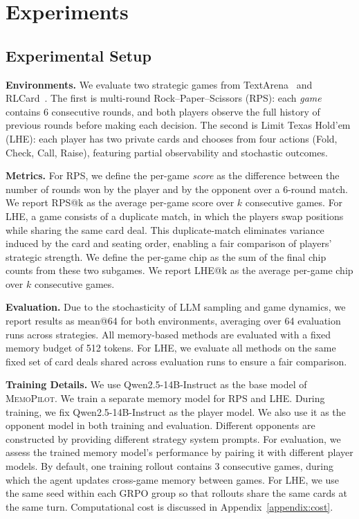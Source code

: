 \documentclass{article}
\newcommand{\methodname}{MemoPilot}
\newcommand{\method}{\textsc{\methodname}}
\theoremstyle{plain}
\theoremstyle{definition}
\theoremstyle{remark}
\begin{document}
\section{Experiments}
\label{sec:experiments}

\subsection{Experimental Setup}

\textbf{Environments.}
We evaluate two strategic games from TextArena~\citep{guertler2025textarena} and RLCard~\citep{zha2019rlcard}. The first is multi-round Rock--Paper--Scissors (RPS): each \emph{game} contains 6 consecutive rounds, and both players observe the full history of previous rounds before making each decision. The second is Limit Texas Hold'em (LHE): each player has two private cards and chooses from four actions (Fold, Check, Call, Raise), featuring partial observability and stochastic outcomes.

\textbf{Metrics.}
For RPS, we define the per-game \emph{score} as the difference between the number of rounds won by the player and by the opponent over a 6-round match. We report RPS@k as the average per-game score over $k$ consecutive games. For LHE, a game consists of a duplicate match, in which the players swap positions while sharing the same card deal. This duplicate-match eliminates variance induced by the card and seating order, enabling a fair comparison of players’ strategic strength. We define the per-game chip as the sum of the final chip counts from these two subgames. We report LHE@k as the average per-game chip over $k$ consecutive games. 

\textbf{Evaluation.}
Due to the stochasticity of LLM sampling and game dynamics, we report results as mean@64 for both environments, averaging over 64 evaluation runs across strategies. All memory-based methods are evaluated with a fixed memory budget of 512 tokens. For LHE, we evaluate all methods on the same fixed set of card deals shared across evaluation runs to ensure a fair comparison. 

\textbf{Training Details.}
We use Qwen2.5-14B-Instruct as the base model of \method{}. We train a separate memory model for RPS and LHE. During training, we fix Qwen2.5-14B-Instruct as the player model. We also use it as the opponent model in both training and evaluation. Different opponents are constructed by providing different strategy system prompts. For evaluation, we assess the trained memory model's performance by pairing it with different player models. By default, one training rollout contains 3 consecutive games, during which the agent updates cross-game memory between games. For LHE, we use the same seed within each GRPO group so that rollouts share the same cards at the same turn. Computational cost is discussed in Appendix~\ref{appendix:cost}.
\end{document}
